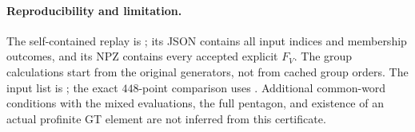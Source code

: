 \paragraph{Reproducibility and limitation.}
The self-contained replay is
;
its JSON contains all input indices and membership outcomes, and
its NPZ contains every accepted explicit $F_V$. The group calculations
start from the original generators, not from cached group orders.
The input list is
;
the exact $448$-point comparison uses
.
Additional common-word conditions with the mixed evaluations,
the full pentagon, and existence of an actual profinite GT element
are not inferred from this certificate.
